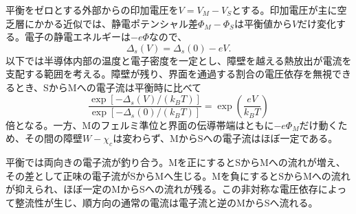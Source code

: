 \documentclass[11pt,a4paper]{article}
\begin{document}
平衡をゼロとする外部からの印加電圧を$V=V_M-V_S$とする。印加電圧が主に空乏層にかかる近似では、静電ポテンシャル差$\Phi_M-\Phi_S$は平衡値から$V$だけ変化する。電子の静電エネルギーは$-e\Phi$なので、
\begin{equation}
 \Delta_s(V)=\Delta_s(0)-eV.
\end{equation}
以下では半導体内部の温度と電子密度を一定とし、障壁を越える熱放出が電流を支配する範囲を考える。障壁が残り、界面を通過する割合の電圧依存を無視できるとき、SからMへの電子流は平衡時に比べて
\begin{equation}
 \frac{\exp[-\Delta_s(V)/(k_BT)]}{\exp[-\Delta_s(0)/(k_BT)]}
 =\exp\!\left(\frac{eV}{k_BT}\right)
\end{equation}
倍となる。一方、Mのフェルミ準位と界面の伝導帯端はともに$-e\Phi_M$だけ動くため、その間の障壁$W-\chi_c$は変わらず、MからSへの電子流はほぼ一定である。

平衡では両向きの電子流が釣り合う。Mを正にするとSからMへの流れが増え、その差として正味の電子流がSからMへ生じる。Mを負にするとSからMへの流れが抑えられ、ほぼ一定のMからSへの流れが残る。この非対称な電圧依存によって整流性が生じ、順方向の通常の電流は電子流と逆のMからSへ流れる。
\end{document}
